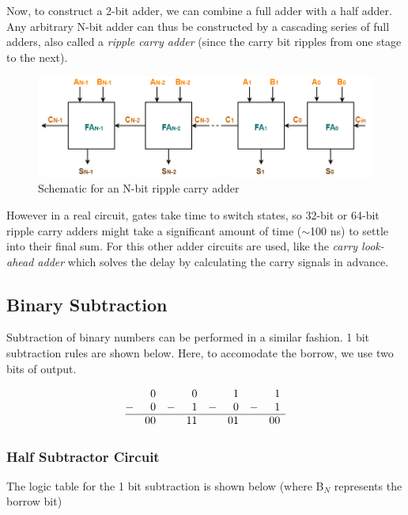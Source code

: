 Now, to construct a 2-bit adder, we can combine a full adder with a half adder. Any arbitrary N-bit adder can thus be constructed by a cascading series of full adders, also called a \textit{ripple carry adder} (since the carry bit ripples from one stage to the next).

\begin{figure}[H]
    \centering
    \includegraphics[width=0.9\columnwidth]{images/n-bit.png}
    \caption{Schematic for an N-bit ripple carry adder}
\end{figure}

However in a real circuit, gates take time to switch states, so 32-bit or 64-bit ripple carry adders might take a significant amount of time ($\sim$100 ns) to settle into their final sum. For this other adder circuits are used, like the \textit{carry look-ahead adder} which solves the delay by calculating the carry signals in advance.


\subsection*{Binary Subtraction}
Subtraction of binary numbers can be performed in a similar fashion. 1 bit subtraction rules are shown below. Here, to accomodate the borrow, we use two bits of output.

\[
\begin{array}{@{}cr@{\,\,\,\,\,\,}rr@{\,\,\,\,\,\,}rr@{\,\,\,\,\,\,}rr}
    & 0 & & 0 & & 1 & & 1\\
-  & 0 & - & 1& - & 0& - & 1\\ \hline
  & 00 & & 11 && 01 && 00
\end{array}
\]

\subsubsection*{Half Subtractor Circuit}

The logic table for the 1 bit subtraction is shown below (where B$_N$ represents the borrow bit)


